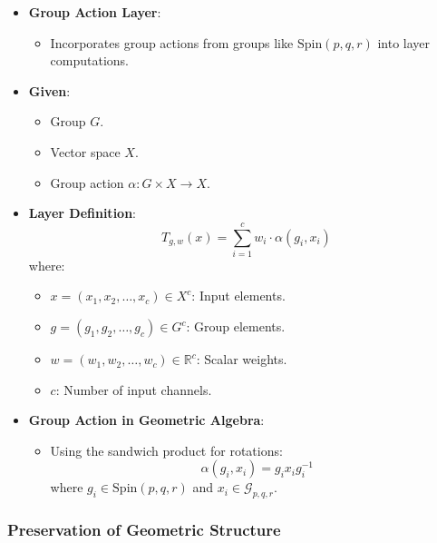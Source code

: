 \documentclass[a4paper,14pt]{article}
\theoremstyle{plain} %
\theoremstyle{definition} %
\theoremstyle{remark} %
\theoremstyle{definition}
\theoremstyle{remark}
\theoremstyle{remark}
\begin{document}
	\begin{itemize}
		\item \textbf{Group Action Layer}:
		\begin{itemize}
			\item Incorporates group actions from groups like \(\mathrm{Spin}(p, q, r)\) into layer computations.
		\end{itemize}
		\item \textbf{Given}:
		\begin{itemize}
			\item Group \( G \).
			\item Vector space \( X \).
			\item Group action \( \alpha: G \times X \rightarrow X \).
		\end{itemize}
		\item \textbf{Layer Definition}:
		\[
		T_{g,w}(x) = \sum_{i=1}^{c} w_i \cdot \alpha(g_i, x_i)
		\]
		where:
		\begin{itemize}
			\item \( x = (x_1, x_2, \dots, x_c) \in X^c \): Input elements.
			\item \( g = (g_1, g_2, \dots, g_c) \in G^c \): Group elements.
			\item \( w = (w_1, w_2, \dots, w_c) \in \mathbb{R}^c \): Scalar weights.
			\item \( c \): Number of input channels.
		\end{itemize}
		\item \textbf{Group Action in Geometric Algebra}:
		\begin{itemize}
			\item Using the sandwich product for rotations:
			\[
			\alpha(g_i, x_i) = g_i x_i g_i^{-1}
			\]
			where \( g_i \in \mathrm{Spin}(p, q, r) \) and \( x_i \in \mathcal{G}_{p,q,r} \).
		\end{itemize}
	\end{itemize}
	
	\subsubsection{Preservation of Geometric Structure}
	
\end{document}
